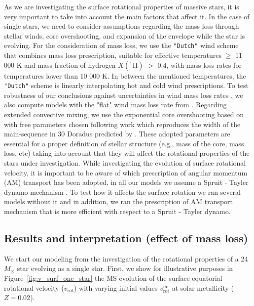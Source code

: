 \documentclass{aa}
\DeclareRobustCommand{\Figref}[1]{Figure~\ref{#1}}
\begin{document}
As we are investigating the surface rotational properties of massive stars, it is very important to take into account the main factors that affect it. In the case of single stars, we need to consider assumptions regarding the
mass loss through stellar winds, core overshooting, and expansion of the envelope while the star is evolving. For the consideration of mass loss, we use the \texttt{"Dutch"}
wind scheme that combines \citet{Vink_2001} mass loss prescription,
suitable for effective temperatures $\geq$ 11 000 K and mass fraction
of hydrogen $X(^{1}\mathrm{H})$ $>$ 0.4, with \citet{Jager_1988}
mass loss rates for temperatures lower than 10 000 K. In between the
mentioned temperatures, the \texttt{"Dutch"} scheme is linearly
interpolating hot and cold wind prescriptions.
To test robustness of our conclusions against uncertainties in wind mass loss rates \citep{renzo:17}, we also compute models with the "flat" wind mass loss rate from \citet{Bjorklund_2023}.
 Regarding extended convective mixing, we use the exponential core overshooting based on
\citet{Herwig_2000} with free parameters chosen following
\cite{claret:18} work which reproduces the width of the main-sequence in 30
Doradus predicted by \citet{Brott_2011}. These adopted parameters are essential for a proper definition of stellar
structure (e.g., mass of the core, mass loss, etc) taking into account
that they will affect the rotational properties of the stars under
investigation.
While investigating the evolution of surface rotational velocity, it is important to be aware of which prescription of angular momentum (AM) transport has been adopted, in all our models we assume a Spruit - Tayler dynamo mechanism \citep{spruit:02}.
To test how it affects the surface rotation we ran several models without it and in addition, we ran the prescription of \citet{fuller:19} AM transport mechanism that is more efficient with respect to a Spruit - Tayler dynamo.


\subsection{Results and interpretation (effect of mass loss)}
\label{sec:res_primordial}


We start our modeling from the investigation of the rotational
properties of a 24\,$M_{\odot}$ star evolving as a single star. First, we
show for illustrative purposes in \Figref{fig:v_surf_one_star} the MS
evolution of the surface equatorial rotational velocity
($v_\mathrm{rot}$) with varying initial values
$v_\mathrm{rot}^\mathrm{ini}$ at solar metallicity ($Z=0.02$).
\end{document}
